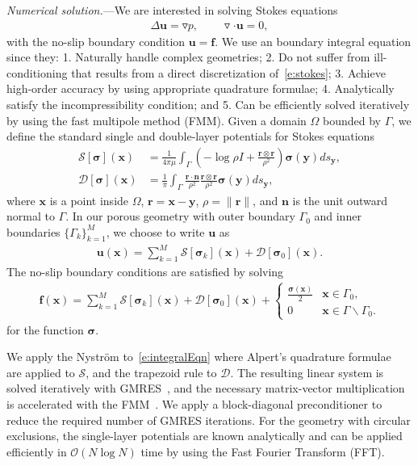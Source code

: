 \documentclass[twocolumn,showpacs,pre,preprintnumbers,floatfix]{revtex4-1}
\newcommand{\ff}{{\mathbf{f}}}
\newcommand{\nn}{{\mathbf{n}}}
\newcommand{\rr}{{\mathbf{r}}}
\newcommand{\ssigma}{{\boldsymbol{\sigma}}}
\newcommand{\uu}{{\mathbf{u}}}
\newcommand{\xx}{{\mathbf{x}}}
\newcommand{\yy}{{\mathbf{y}}}
\newcommand{\grad}{{\triangledown}}
\newcommand{\bigO}{{\mathcal{O}}}
\renewcommand{\SS}{{\mathcal{S}}}
\newcommand{\DD}{{\mathcal{D}}}
\begin{document}
{\em Numerical solution.}---We are interested in solving Stokes
equations
\begin{align}
  \Delta \uu  = \grad p, \qquad \grad \cdot \uu = 0,
  \label{e:stokes}
\end{align}
with the no-slip boundary condition $\uu = \ff$.  We use an boundary
integral equation since they: 1. Naturally handle complex geometries;
2. Do not suffer from ill-conditioning that results from a direct
discretization of~\eqref{e:stokes}; 3. Achieve high-order accuracy by
using appropriate quadrature formulae; 4. Analytically satisfy the
incompressibility condition; and 5. Can be efficiently solved
iteratively by using the fast multipole method (FMM).  Given a domain
$\Omega$ bounded by $\Gamma$, we define the standard single and
double-layer potentials for Stokes equations~\cite{poz1992}
\begin{align}
  \SS[\ssigma](\xx) &= \frac{1}{4\pi\mu}\int_{\Gamma} \left(
  -\log\rho I + \frac{\rr \otimes\rr}{\rho^{2}} 
  \right)\ssigma(\yy)ds_{\yy},  \\
  \DD[\ssigma](\xx) &= \frac{1}{\pi}\int_{\Gamma} 
  \frac{\rr \cdot \nn}{\rho^{2}}\frac{\rr \otimes \rr}{\rho^{2}}
  \ssigma(\yy)ds_{\yy},
\end{align}
where $\xx$ is a point inside $\Omega$, $\rr = \xx - \yy$, $\rho =
\|\rr\|$, and $\nn$ is the unit outward normal to $\Gamma$.  In our
porous geometry with outer boundary $\Gamma_{0}$ and inner boundaries
$\{\Gamma_{k}\}_{k=1}^{M}$, we choose to write $\uu$ as
\begin{align}
  \uu(\xx) = \sum_{k=1}^{M} \SS[\ssigma_{k}](\xx) + 
    \DD[\ssigma_{0}](\xx).
  \label{e:integralRep}
\end{align}
The no-slip boundary conditions are satisfied by solving 
\begin{align}
  \ff(\xx) = \sum_{k=1}^{M} \SS[\ssigma_{k}](\xx) + 
    \DD[\ssigma_{0}](\xx) + 
    \left\{
    \begin{array}{cl}
      \frac{\ssigma(\xx)}{2} & \xx \in \Gamma_{0}, \\
      0 & \xx \in \Gamma \backslash \Gamma_{0}.
    \end{array}
    \right.
    \label{e:integralEqn}
\end{align}
for the function $\ssigma$.

We apply the Nystr\"{o}m to~\eqref{e:integralEqn} where Alpert's
quadrature formulae~\cite{alp1999} are applied to $\SS$, and the
trapezoid rule to $\DD$.  The resulting linear system is solved
iteratively with GMRES~\cite{saa:sch1986}, and the necessary
matrix-vector multiplication is accelerated with the
FMM~\cite{cmcl2012}.  We apply a block-diagonal preconditioner to reduce
the required number of GMRES iterations.  For the geometry with circular
exclusions, the single-layer potentials are known analytically and can
be applied efficiently in $\bigO(N \log N)$ time by using the Fast
Fourier Transform (FFT).
\end{document}
